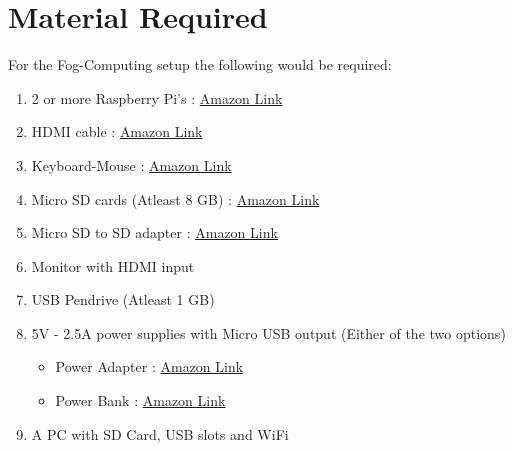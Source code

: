 \documentclass{article}
\begin{document}
\section{Material Required}
For the Fog-Computing setup the following would be required:
\begin{enumerate}
\item 2 or more Raspberry Pi's : \href{https://www.amazon.com/Raspberry-Pi-RASPBERRYPI3-MODB-1GB-Model-Motherboard/dp/B01CD5VC92/ref=sr_1_3?s=pc&ie=UTF8&qid=1528948400&sr=1-3&keywords=raspberry+pi+3}{Amazon Link}
\item HDMI cable : \href{https://www.amazon.com/AmazonBasics-High-Speed-HDMI-Cable-1-Pack/dp/B014I8SSD0/ref=sr_1_1_acs_sk_pb_1_sl_1?ie=UTF8&qid=1528948612&sr=8-1-acs&keywords=HDMI+Cable}{Amazon Link}
\item Keyboard-Mouse : \href{https://www.amazon.com/AmazonBasics-Wired-Keyboard-Mouse-Bundle/dp/B00B7GV802/ref=sr_1_1_sspa?s=electronics&ie=UTF8&qid=1528948656&sr=1-1-spons&keywords=keyboard+mouse&psc=1}{Amazon Link}
\item Micro SD cards (Atleast 8 GB) : \href{https://www.amazon.com/dp/B073JYVKNX/ref=sxts_k2p-hero-vn_bs_1?pf_rd_m=ATVPDKIKX0DER&pf_rd_p=3338417525430323799&pd_rd_wg=uUtqX&pf_rd_r=J02KSGBGGGV7S9B4CYZW&pf_rd_s=desktop-sx-top-slot&pf_rd_t=301&pd_rd_i=B073JYVKNX&pd_rd_w=4K3bM&pf_rd_i=micro+sd+card&pd_rd_r=8057615f-9cb8-4c23-ace6-39218b385876&ie=UTF8&qid=1528948722&sr=1}{Amazon Link}
\item Micro SD to SD adapter : \href{https://www.amazon.com/SanDisk-microSD-Memory-Adapter-MICROSD-ADAPTER/dp/B0047WZOOO/ref=sr_1_3?s=electronics&ie=UTF8&qid=1528949416&sr=1-3&keywords=micro+sd+to+sd+adapter}{Amazon Link}
\item Monitor with HDMI input
\item USB Pendrive (Atleast 1 GB)
\item 5V - 2.5A power supplies with Micro USB output (Either of the two options) 
\begin{itemize}
\item Power Adapter : \href{https://www.amazon.com/CanaKit-Raspberry-Supply-Adapter-Listed/dp/B00MARDJZ4}{Amazon Link}
\item Power Bank : \href{https://www.amazon.com/KMASHI-15000mAh-External-Portable-Powerful/dp/B00JP8MZGK/ref=sr_1_3?s=electronics&ie=UTF8&qid=1528949090&sr=1-3&keywords=5v+2a+power+bank}{Amazon Link}
\end{itemize}
\item A PC with SD Card, USB slots and WiFi
\end{enumerate}
\end{document}
